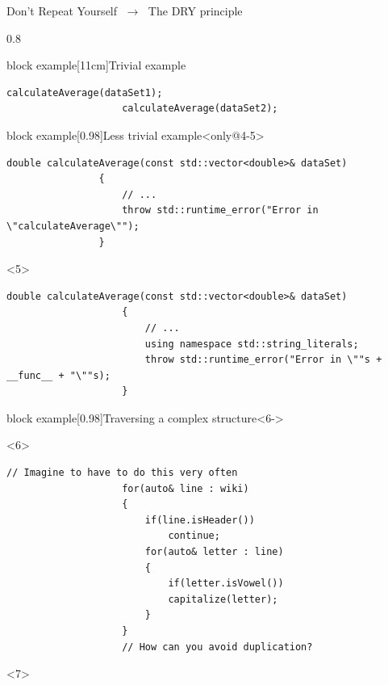 \begin{frame}[fragile]{Don't Repeat Yourself $\;\to\;$ The DRY principle}
\begin{overlayarea}{\textwidth}{0.8\textheight}
\begin{varblock}{block example}[11cm]{Trivial example}
\begin{onlyenv}
\begin{lstlisting}[style=MyCpp]
                    calculateAverage(dataSet1);
                    calculateAverage(dataSet2);
                \end{lstlisting}
            \end{onlyenv}
        \end{varblock}
        \begin{varblock}{block example}[0.98\textwidth]{Less trivial example}<only@4-5>
            \begin{lstlisting}[style=MyCpp]
                double calculateAverage(const std::vector<double>& dataSet)
                {
                    // ...
                    throw std::runtime_error("Error in \"calculateAverage\"");
                }
            \end{lstlisting}
            \begin{uncoverenv}<5>
                \begin{lstlisting}[style=MyCpp]
                    double calculateAverage(const std::vector<double>& dataSet)
                    {
                        // ...
                        using namespace std::string_literals;
                        throw std::runtime_error("Error in \""s + __func__ + "\""s);
                    }
                \end{lstlisting}
            \end{uncoverenv}
        \end{varblock}
        \PrepareURLsymbol[PB]
        \begin{varblock}{block example}[0.98\textwidth]{Traversing a complex structure}<6->
            \begin{onlyenv}<6>
                \begin{lstlisting}[style=MyCpp]
                    // Imagine to have to do this very often
                    for(auto& line : wiki)
                    {
                        if(line.isHeader())
                            continue;
                        for(auto& letter : line)
                        {
                            if(letter.isVowel())
                            capitalize(letter);
                        }
                    }
                    // How can you avoid duplication?
                \end{lstlisting}
            \end{onlyenv}
            \begin{onlyenv}<7>

\end{onlyenv}
\end{varblock}
\end{overlayarea}
\end{frame}
